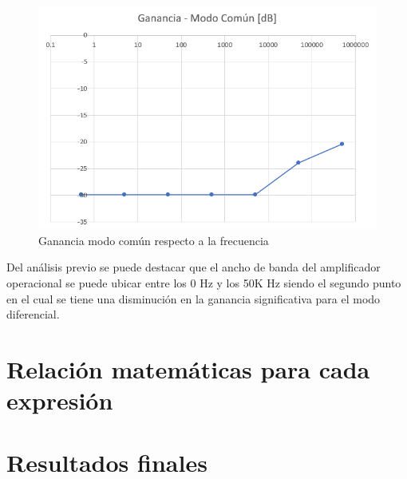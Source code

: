 \begin{figure}[h]
	\centering
	\includegraphics[width=0.5\linewidth]{media/grafica-acvsf}
	\caption{Ganancia modo común respecto a la frecuencia}
	\label{fig:grafica-acvsf}
\end{figure}

Del análisis previo se puede destacar que el ancho de banda del amplificador operacional se puede ubicar entre los 0 Hz y los 50K Hz siendo el segundo punto en el cual se tiene una disminución en la ganancia significativa para el modo diferencial.

\section{Relación matemáticas para cada expresión}
\section*{Resultados finales}



